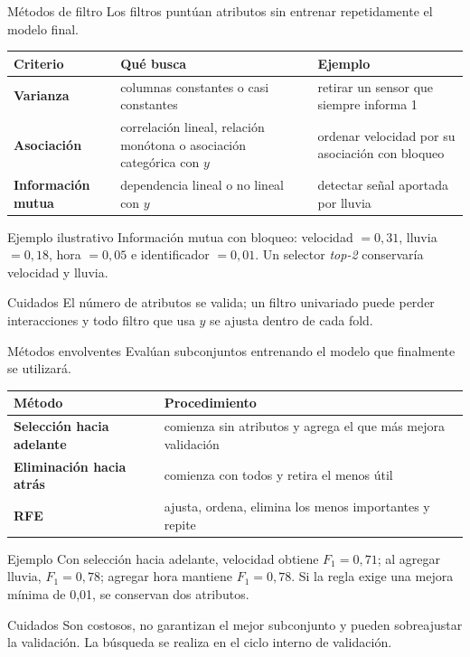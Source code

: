 \documentclass[aspectratio=169,10pt]{beamer}
\begin{document}
\begin{frame}{Métodos de filtro}
  \footnotesize
  Los filtros puntúan atributos sin entrenar repetidamente el modelo final.
  \begin{tabularx}{\textwidth}{>{\bfseries}p{}p{}X}
    \toprule Criterio & Qué busca & Ejemplo \\ \midrule
    Varianza & columnas constantes o casi constantes & retirar un sensor que siempre informa 1 \\
    Asociación & correlación lineal, relación monótona o asociación categórica con $y$ & ordenar velocidad por su asociación con bloqueo \\
    Información mutua & dependencia lineal o no lineal con $y$ & detectar señal aportada por lluvia \\
    \bottomrule
  \end{tabularx}
  \begin{block}{Ejemplo ilustrativo}
    Información mutua con bloqueo: velocidad $=0{,}31$, lluvia $=0{,}18$, hora $=0{,}05$ e identificador $=0{,}01$. Un selector \textit{top-2} conservaría velocidad y lluvia.
  \end{block}
  \begin{alertblock}{Cuidados}
    El número de atributos se valida; un filtro univariado puede perder interacciones y todo filtro que usa $y$ se ajusta dentro de cada fold.
  \end{alertblock}
\end{frame}

\begin{frame}{Métodos envolventes}
  \footnotesize
  Evalúan subconjuntos entrenando el modelo que finalmente se utilizará.
  \begin{tabularx}{\textwidth}{>{\bfseries}p{}X}
    \toprule Método & Procedimiento \\ \midrule
    Selección hacia adelante & comienza sin atributos y agrega el que más mejora validación \\
    Eliminación hacia atrás & comienza con todos y retira el menos útil \\
    RFE & ajusta, ordena, elimina los menos importantes y repite \\
    \bottomrule
  \end{tabularx}
  \begin{block}{Ejemplo}
    Con selección hacia adelante, velocidad obtiene $F_1=0{,}71$; al agregar lluvia, $F_1=0{,}78$; agregar hora mantiene $F_1=0{,}78$. Si la regla exige una mejora mínima de 0,01, se conservan dos atributos.
  \end{block}
  \begin{alertblock}{Cuidados}
    Son costosos, no garantizan el mejor subconjunto y pueden sobreajustar la validación. La búsqueda se realiza en el ciclo interno de validación.
  \end{alertblock}
\end{frame}
\end{document}
